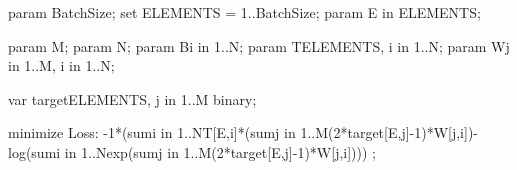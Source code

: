 param BatchSize;
set ELEMENTS = 1..BatchSize;
param E in ELEMENTS;

param M;
param N;
param B{i in 1..N};
param T{ELEMENTS, i in 1..N};
param W{j in 1..M, i in 1..N};

var target{ELEMENTS, j in 1..M} binary;

minimize Loss:
	-1*(sum{i in 1..N}T[E,i]*(sum{j in 1..M}(2*target[E,j]-1)*W[j,i])-log(sum{i in 1..N}exp(sum{j in 1..M}(2*target[E,j]-1)*W[j,i]))) ;
	



	

